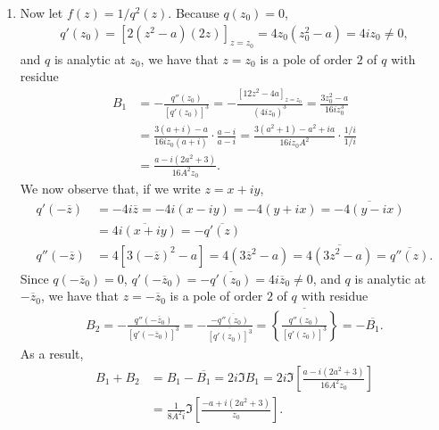 \documentclass[a4paper,12pt]{article}
\begin{document}
\begin{enumerate}
\begin{enumerate}
            \item
                Now let $f(z) = 1/q^2(z)$. Because $q(z_0) = 0$,
                \begin{align*}
                    q'(z_0) = [2(z^2 - a)(2z)]_{z = z_0} = 4z_0(z_0^2 - a) = 4iz_0 \neq 0,
                \end{align*}
                and $q$ is analytic at $z_0$, we have that $z = z_0$ is a pole of order $2$ of $q$ with residue
                \begin{align*}
                    B_1 &= -\frac{q''(z_0)}{[q'(z_0)]^3} = -\frac{[12z^2 - 4a]_{z = z_0}}{(4iz_0)^3} = \frac{3z_0^2 - a}{16iz_0^3} \\
                    &= \frac{3(a + i) - a}{16iz_0(a + i)} \cdot \frac{a - i}{a - i} = \frac{3(a^2 + 1) - a^2 + ia}{16iz_0A^2} \cdot \frac{1/i}{1/i} \\
                    &= \frac{a - i(2a^2 + 3)}{16A^2 z_0}.
                \end{align*}
                We now observe that, if we write $z = x + iy$,
                \begin{align*}
                    q'(-\overline{z}) &= -4i\overline{z} = -4i(x - iy) = -4(y + ix) = \overline{-4(y - ix)} \\
                    &= \overline{4i(x + iy)} = -\overline{q'(z)} \\
                    q''(-\overline{z}) &= 4[3(-\overline{z})^2 - a] = 4(3\overline{z}^2 - a) = \overline{4(3z^2 - a)} = \overline{q''(z)}.
                \end{align*}
                Since $q(-\overline{z}_0) = 0$, $q'(-\overline{z}_0) = -\overline{q'(z_0)} = 4i\overline{z}_0 \neq 0$, and $q$ is analytic at $-\overline{z}_0$, we have that $z = -\overline{z}_0$ is a pole of order $2$ of $q$ with residue
                \begin{align*}
                    B_2 = -\frac{q''(-\overline{z}_0)}{[q'(-\overline{z}_0)]^3} = -\frac{-\overline{q''(z_0)}}{\overline{[q'(z_0)]^3}} = \overline{\left\{ \frac{q''(z_0)}{[q'(z_0)]^3} \right\}} = -\overline{B_1}.
                \end{align*}
                As a result,
                \begin{align*}
                    B_1 + B_2 &= B_1 - \overline{B_1} = 2i \Im B_1 = 2i \Im \left[ \frac{a - i(2a^2 + 3)}{16A^2 z_0} \right] \\
                    &= \frac{1}{8A^2 i} \Im \left[ \frac{-a + i(2a^2 + 3)}{z_0} \right].
                \end{align*}


\end{enumerate}
\end{enumerate}
\end{document}
